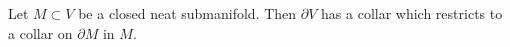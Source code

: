 Let $M \subset V$ be a closed neat submanifold. Then $\partial V$ has a collar which restricts to a collar on $\partial M$ in $M$.
